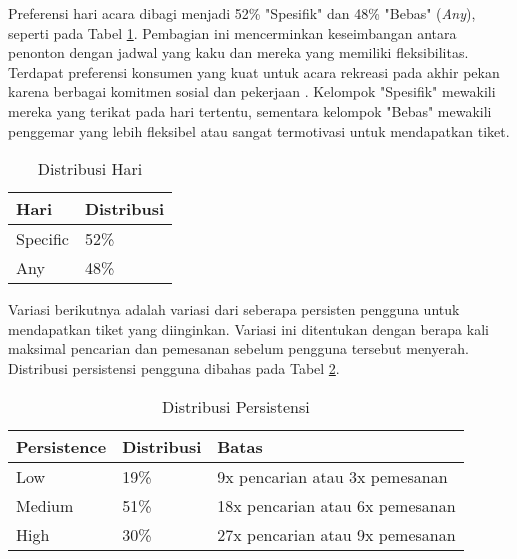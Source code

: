 Preferensi hari acara dibagi menjadi 52\% "Spesifik" dan 48\% "Bebas" (\textit{Any}), seperti pada Tabel \ref{table:distribusi-hari}. Pembagian ini mencerminkan keseimbangan antara penonton dengan jadwal yang kaku dan mereka yang memiliki fleksibilitas. Terdapat preferensi konsumen yang kuat untuk acara rekreasi pada akhir pekan karena berbagai komitmen sosial dan pekerjaan \parencite{rgate2013}. Kelompok "Spesifik" mewakili mereka yang terikat pada hari tertentu, sementara kelompok "Bebas" mewakili penggemar yang lebih fleksibel atau sangat termotivasi untuk mendapatkan tiket.

\begin{table}[h]
    \centering
    \caption{Distribusi Hari}
    \label{table:distribusi-hari}
    \begin{tabular}{|l|l|}
        \hline
        \textbf{Hari} & \textbf{Distribusi} \\
        \hline
        Specific      & 52\%                \\
        \hline
        Any           & 48\%                \\
        \hline
    \end{tabular}
\end{table}

Variasi berikutnya adalah variasi dari seberapa persisten pengguna untuk mendapatkan tiket yang diinginkan. Variasi ini ditentukan dengan berapa kali maksimal pencarian dan pemesanan sebelum pengguna tersebut menyerah. Distribusi persistensi pengguna dibahas pada Tabel \ref{table:distribusi-persistensi}.

\begin{table}[h]
    \centering
    \caption{Distribusi Persistensi}
    \label{table:distribusi-persistensi}
    \begin{tabular}{|l|l|l|}
        \hline
        \textbf{Persistence} & \textbf{Distribusi} & \textbf{Batas}                      \\
        \hline
        Low                  & 19\%                & 9x pencarian atau 3x pemesanan      \\
        \hline
        Medium               & 51\%                & 18x pencarian atau 6x     pemesanan \\
        \hline
        High                 & 30\%                & 27x pencarian atau 9x pemesanan     \\
        \hline
    \end{tabular}
\end{table}

